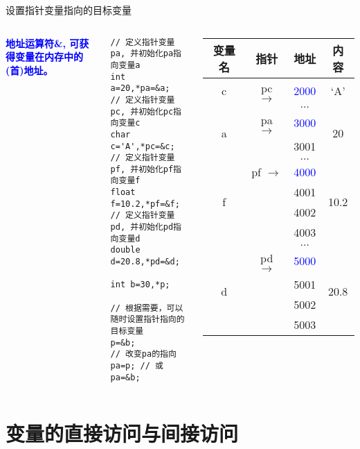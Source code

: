 \begin{frame}{设置指针变量指向的目标变量}
\vspace{-0.4cm}
\begin{columns}[T]
\textbf{\textcolor{blue}{地址运算符\&, 可获得变量在内存中的(首)地址。}}
\begin{lstlisting}
// 定义指针变量pa, 并初始化pa指向变量a
int a=20,*pa=&a; 
// 定义指针变量pc, 并初始化pc指向变量c
char c='A',*pc=&c; 
// 定义指针变量pf, 并初始化pf指向变量f
float f=10.2,*pf=&f; 
// 定义指针变量pd, 并初始化pd指向变量d
double d=20.8,*pd=&d;

int b=30,*p; 

// 根据需要，可以随时设置指针指向的目标变量
p=&b; 
// 改变pa的指向
pa=p; // 或 pa=&b;
\end{lstlisting}
\small
\begin{tabular}{|c|c|c|c|}
	\hline 
	\textbf{变量名} & \textbf{指针} &\textbf{地址} & \textbf{内容} \\ 
	\hline 
	c & pc $\to$& \textcolor{blue}{2000} & `A' \\ 
	\hline 
	& & $\dots$ &  \\ 
	\hline 
	\multirow{2}{*}{a} &  pa $\to$ & \textcolor{blue}{3000} & \multirow{2}{*}{20} \\ \cline{3-3} 
	& & 3001 &  \\ 
	\hline 
	& & $\dots$ &  \\ 
	\hline 
	\multirow{4}{*}{f} &  pf $\to$ & \textcolor{blue}{4000} & \multirow{4}{*}{10.2}  \\ \cline{3-3} 
	& & 4001 &  \\ \cline{3-3}
	& & 4002 &  \\ \cline{3-3}
	& &4003 &  \\ 
	\hline 
	& & $\dots$ &  \\ 
	\hline 
	\multirow{4}{*}{d} &  pd $\to$ & \textcolor{blue}{5000} & \multirow{4}{*}{20.8} \\ \cline{3-3}
	& & 5001 &  \\ \cline{3-3}
	& & 5002 &  \\ \cline{3-3}
	& & 5003 &  \\ 
	\hline 
\end{tabular} 
\end{columns}
\medskip
\end{frame}

\section{变量的直接访问与间接访问}

